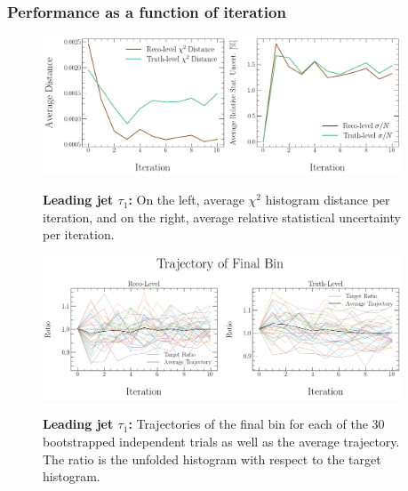 \subsubsection{Performance as a function of iteration}
\begin{figure}[!htb]
\centering
\includegraphics[width=0.95\textwidth]{figures/num_iterations_study/tau1_trackj1/iteration_study_30x10-distances-and-stat-uncert.png}\\
\caption{\textbf{Leading jet $\tau_1$:} On the left, average $\chi^2$ histogram distance per iteration, and on the right, average relative statistical uncertainty per iteration.}
\label{fig:num_iterations:tau1_distances_stat_uncert}
\end{figure}
\begin{figure}[!htb]
\centering
\includegraphics[width=0.95\textwidth]{figures/num_iterations_study/tau1_trackj1/iteration_study_30x10-final_bin.png}\\
\caption{\textbf{Leading jet $\tau_1$:} Trajectories of the final bin for each of the 30 bootstrapped independent trials as well as the average trajectory. The ratio is the unfolded histogram with respect to the target histogram.}
\label{fig:num_iterations:tau1_final_bin}
\end{figure}



